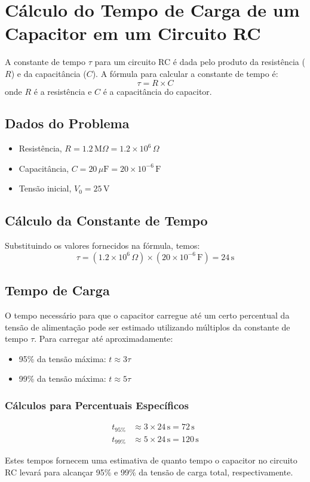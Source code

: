 \documentclass{article}
\begin{document}
\section*{Cálculo do Tempo de Carga de um Capacitor em um Circuito RC}

A constante de tempo $\tau$ para um circuito RC é dada pelo produto da resistência ($R$) e da capacitância ($C$). A fórmula para calcular a constante de tempo é:
\[
\tau = R \times C
\]
onde $R$ é a resistência e $C$ é a capacitância do capacitor.

\subsection*{Dados do Problema}
\begin{itemize}
    \item Resistência, $R = 1.2 \, \text{M}\Omega = 1.2 \times 10^6 \, \Omega$
    \item Capacitância, $C = 20 \, \mu\text{F} = 20 \times 10^{-6} \, \text{F}$
    \item Tensão inicial, $V_0 = 25 \, \text{V}$
\end{itemize}

\subsection*{Cálculo da Constante de Tempo}
Substituindo os valores fornecidos na fórmula, temos:
\[
\tau = (1.2 \times 10^6 \, \Omega) \times (20 \times 10^{-6} \, \text{F}) = 24 \, \text{s}
\]

\subsection*{Tempo de Carga}
O tempo necessário para que o capacitor carregue até um certo percentual da tensão de alimentação pode ser estimado utilizando múltiplos da constante de tempo $\tau$. Para carregar até aproximadamente:
\begin{itemize}
    \item 95\% da tensão máxima: $t \approx 3\tau$
    \item 99\% da tensão máxima: $t \approx 5\tau$
\end{itemize}

\subsubsection*{Cálculos para Percentuais Específicos}
\begin{align*}
t_{95\%} &\approx 3 \times 24 \, \text{s} = 72 \, \text{s} \\
t_{99\%} &\approx 5 \times 24 \, \text{s} = 120 \, \text{s}
\end{align*}

Estes tempos fornecem uma estimativa de quanto tempo o capacitor no circuito RC levará para alcançar 95\% e 99\% da tensão de carga total, respectivamente.
\end{document}
